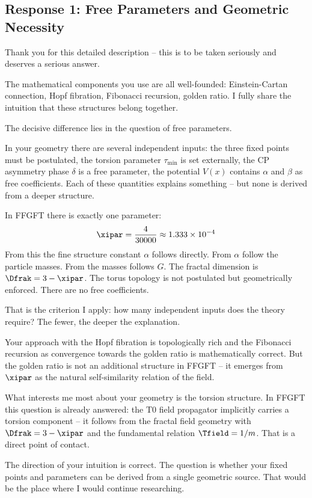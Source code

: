 \subsection{Response 1: Free Parameters and Geometric Necessity}

\begin{response}
Thank you for this detailed description -- this is to be taken seriously and deserves a serious answer.

The mathematical components you use are all well-founded: Einstein-Cartan connection, Hopf fibration, Fibonacci recursion, golden ratio. I fully share the intuition that these structures belong together.

The decisive difference lies in the question of free parameters.

In your geometry there are several independent inputs: the three fixed points must be postulated, the torsion parameter $\tau_{\min}$ is set externally, the CP asymmetry phase $\delta$ is a free parameter, the potential $V(x)$ contains $\alpha$ and $\beta$ as free coefficients. Each of these quantities explains something -- but none is derived from a deeper structure.

In FFGFT there is exactly one parameter:
\begin{equation}
  \xipar = \frac{4}{30000} \approx 1.333 \times 10^{-4}
\end{equation}
From this the fine structure constant $\alpha$ follows directly. From $\alpha$ follow the particle masses. From the masses follows $G$. The fractal dimension is $\Dfrak = 3 - \xipar$. The torus topology is not postulated but geometrically enforced. There are no free coefficients.

\medskip
That is the criterion I apply: how many independent inputs does the theory require? The fewer, the deeper the explanation.

\medskip
Your approach with the Hopf fibration is topologically rich and the Fibonacci recursion as convergence towards the golden ratio is mathematically correct. But the golden ratio is not an additional structure in FFGFT -- it emerges from $\xipar$ as the natural self-similarity relation of the field.

\medskip
What interests me most about your geometry is the torsion structure. In FFGFT this question is already answered: the T0 field propagator implicitly carries a torsion component -- it follows from the fractal field geometry with $\Dfrak = 3 - \xipar$ and the fundamental relation $\Tfield = 1/m$. That is a direct point of contact.

\medskip
The direction of your intuition is correct. The question is whether your fixed points and parameters can be derived from a single geometric source. That would be the place where I would continue researching.
\end{response}

